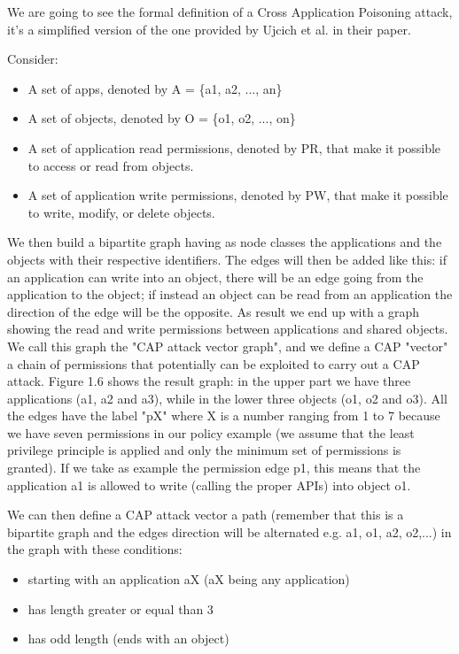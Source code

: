 We are going to see the formal definition of a Cross Application Poisoning attack, it's a simplified version of the one provided by Ujcich et al. in their paper. 

Consider:
\begin{itemize}
  \item A set of apps, denoted by A = \{a1, a2, ..., an\}
  \item A set of objects, denoted by O = \{o1, o2, ..., on\}
  \item A set of application read permissions, denoted by PR, that make it possible to access or read from objects.
  \item A set of application write permissions, denoted by PW, that make it possible to write, modify, or delete objects.
\end{itemize}

We then build a bipartite graph having as node classes the applications and the objects with their respective identifiers. The edges will then be added like this: if an application can write into an object, there will be an edge going from the application to the object; if instead an object can be read from an application the direction of the edge will be the opposite. As result we end up with a graph showing the read and write permissions between applications and shared objects. We call this graph the "CAP attack vector graph", and we define a CAP "vector" a chain of permissions that potentially can be exploited to carry out a CAP attack. Figure 1.6 shows the result graph: in the upper part we have three applications (a1, a2 and a3), while in the lower three objects (o1, o2 and o3). All the edges have the label "pX" where X is a number ranging from 1 to 7 because we have seven permissions in our policy example (we assume that the least privilege principle is applied and only the minimum set of permissions is granted). If we take as example the permission edge p1, this means that the application a1 is allowed to write (calling the proper APIs) into object o1. 

We can then define a CAP attack vector a path (remember that this is a bipartite graph and the edges direction will be alternated e.g. a1, o1, a2, o2,...) in the graph with these conditions:
\begin{itemize}
  \item starting with an application aX (aX being any application)
  \item has length greater or equal than 3
  \item has odd length (ends with an object)
\end{itemize}

